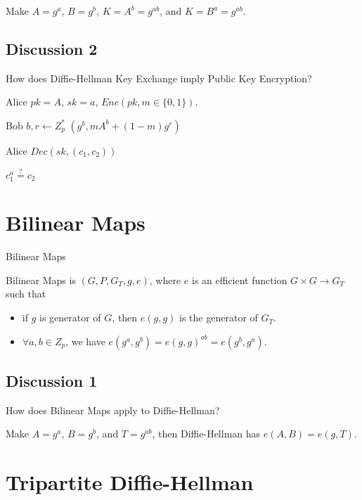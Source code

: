 Make $A=g^a$, $B=g^b$, $K=A^b=g^{ab}$, and $K=B^a=g^{ab}$.


\subsection{Discussion 2}


How does Diffie-Hellman Key Exchange imply Public Key Encryption?


Alice
$pk = A$, $sk = a$, $Enc(pk, m \in \{0, 1\})$.

Bob
$b,r \gets Z^*_p$
$(g^b, mA^b+(1-m)g^r)$

Alice $Dec(sk, (c_1, c_2))$

$c_1^a \stackrel{?}{=} c_2$




\section{Bilinear Maps}

\begin{definition}{Bilinear Maps}

Bilinear Maps is $(G,P,G_T,g,e)$, where $e$ is an efficient function $G \times G \to G_T$ such that

\begin{itemize}
\item if $g$ is generator of $G$, then $e(g, g)$ is the generator of $G_T$.
\item $\forall a,b \in Z_p$, we have $e(g^a, g^b) = e(g, g)^{ab} = e(g^b, g^a)$.
\end{itemize}

\end{definition}

\subsection{Discussion 1}


How does Bilinear Maps apply to Diffie-Hellman?

Make $A=g^a$, $B=g^b$, and $T=g^{ab}$, then Diffie-Hellman has $e(A, B)=e(g, T)$.


\section{Tripartite Diffie-Hellman}


